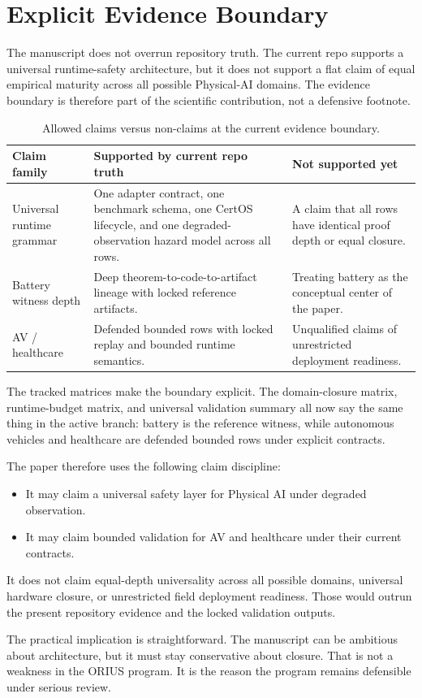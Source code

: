 \section{Explicit Evidence Boundary}
\label{sec:prof-evidence-boundary}

The manuscript does not overrun repository truth. The current repo supports a
universal runtime-safety architecture, but it does not support a flat claim
of equal empirical maturity across all possible Physical-AI domains. The
evidence boundary is therefore part of the scientific contribution, not a
defensive footnote.

\begin{table}[t]
\centering
\caption{Allowed claims versus non-claims at the current evidence boundary.}
\label{tab:prof-evidence-boundary}
\small
\begin{tabularx}{\textwidth}{@{}p{}p{}p{}@{}}
\toprule
\textbf{Claim family} & \textbf{Supported by current repo truth} & \textbf{Not supported yet}\\
\midrule
Universal runtime grammar & One adapter contract, one benchmark schema, one CertOS lifecycle, and one degraded-observation hazard model across all rows. & A claim that all rows have identical proof depth or equal closure.\\
Battery witness depth & Deep theorem-to-code-to-artifact lineage with locked reference artifacts. & Treating battery as the conceptual center of the paper.\\
AV / healthcare & Defended bounded rows with locked replay and bounded runtime semantics. & Unqualified claims of unrestricted deployment readiness.\\
\bottomrule
\end{tabularx}
\end{table}

The tracked matrices make the boundary explicit. The domain-closure matrix,
runtime-budget matrix, and universal validation summary all now say the same
thing in the active branch: battery is the reference witness, while autonomous
vehicles and healthcare are defended bounded rows under explicit contracts.

The paper therefore uses the following claim discipline:
\begin{itemize}
  \item It may claim a universal safety layer for Physical AI under degraded observation.
  \item It may claim bounded validation for AV and healthcare under their current contracts.
\end{itemize}

It does not claim equal-depth universality across all possible domains, universal
hardware closure, or unrestricted field deployment readiness.  Those would outrun the
present repository evidence and the locked validation outputs.

The practical implication is straightforward.  The manuscript can be ambitious about
architecture, but it must stay conservative about closure.  That is not a weakness in
the ORIUS program.  It is the reason the program remains defensible under serious
review.
